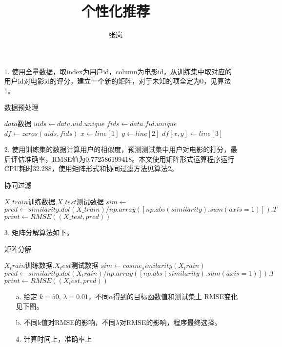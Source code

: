 \documentclass[12pt]{article}
\title{个性化推荐}
\author{张岚}
\begin{document}
\maketitle

\begin{enumerate}
\item[1.] 使用全量数据，取index为用户id，column为电影id，从训练集中取对应的用户id对电影id的评分，建立一个新的矩阵，对于未知的项全定为0，见算法1。
 \begin{algorithm}
        \caption{数据预处理}
        \begin{algorithmic}[1] %
            \Require $data$数据
                \State $uids \gets data.uid.unique$
                \State $fids \gets data.fid.unique$
                \State $df \gets zeros(uids,fids)$
                	    \State $x \gets line[1]$
	    	    \State $y \gets line[2]$
                     \State $df[x,y]  \gets line[3]$
                \EndFor
                \State {}
            \EndFunction    
        \end{algorithmic}
\end{algorithm}

\item[2.] 使用训练集的数据计算用户的相似度，预测测试集中用户对电影的打分，最后评估准确率，RMSE值为0.772586199418。本文使用矩阵形式运算程序运行CPU耗时32.288，使用矩阵形式和协同过滤方法见算法2。
 \begin{algorithm}
        \caption{协同过滤}
        \begin{algorithmic}[1] %
            \Require $X\_train$训练数据,$X\_test$测试数据
                \State $sim \gets $ 
                \State $pred \gets similarity.dot(X\_train) / np.array([np.abs(similarity).sum(axis=1)]).T$
                \State $print  \gets RMSE((X\_test,pred))$
            \EndFunction    
        \end{algorithmic}
\end{algorithm}

\item[3.] 矩阵分解算法如下。
 \begin{algorithm}
        \caption{矩阵分解}
        \begin{algorithmic}[1] %
            \Require $X_train$训练数据,$X_test$测试数据
                \State $sim \gets cosine_similarity(X_train)$
                \State $pred \gets similarity.dot(X_train) / np.array([np.abs(similarity).sum(axis=1)]).T$
                \State $print  \gets RMSE((X_test,pred))$
            \EndFunction    
        \end{algorithmic}
\end{algorithm}

\begin{enumerate}
\item[a.] 给定 $k=50$, $\lambda = 0.01$，不同$\alpha$得到的目标函数值和测试集上 RMSE变化见下图。
\item[b.] 不同k值对RMSE的影响，不同$\lambda$对RMSE的影响，程序最终选择。


\item[4.] 计算时间上，准确率上
\end{enumerate}
\end{enumerate}
\end{document}
